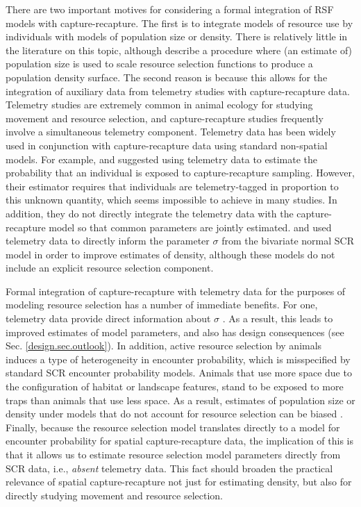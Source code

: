 There are two important motives for considering a formal integration
of RSF models with capture-recapture. The first is to integrate models
of resource use by individuals with models of population size or
density. There is relatively little in the literature on this topic,
although \citet{boyce_mcdonald:1999} describe a procedure where (an
estimate of) population size is used to scale resource selection
functions to produce a population density surface. The second reason is because
this allows for the integration of auxiliary data from telemetry
studies with capture-recapture data.  Telemetry studies are extremely
common in animal ecology for studying movement and resource selection,
and capture-recapture studies frequently involve a simultaneous
telemetry component.  Telemetry data has been widely used in
conjunction with capture-recapture data using standard non-spatial
models.  For example, \citet{white_shenk:2001} and \citet{ivan:2012}
suggested using telemetry data to estimate the probability that an
individual is exposed to capture-recapture sampling. However, their estimator requires
that individuals are telemetry-tagged in proportion to this unknown quantity,
which seems impossible to achieve in many studies. In addition, they
do not directly integrate the telemetry data with the
capture-recapture model so that common parameters are jointly
estimated.  \citet{sollmann_etal:inprepjapplecol} and
\citet{sollmann_etal:2012ecol} used telemetry data to directly inform
the parameter $\sigma$ from the bivariate normal SCR model in order to
improve estimates of density, although these models do not include an
explicit resource selection component.

Formal integration of capture-recapture with telemetry data for the
purposes of modeling resource selection has a number of immediate
benefits. For one, telemetry data provide direct information about
$\sigma$
\citep{sollmann_etal:2012ecol,sollmann_etal:inprepjapplecol}. As a
result, this leads to improved estimates of model parameters, and also
has design consequences (see Sec. \ref{design.sec.outlook}).  In
addition, active resource selection by animals induces a type of
heterogeneity in encounter probability, which is misspecified by
standard SCR encounter probability models.  Animals that use more
space due to the configuration of habitat or landscape features, stand
to be exposed to more traps than animals that use less space.
As a result, estimates of
population size or density under models that do not account for
resource selection can be biased \citep{royle_etal:2012mee}.  Finally,
because the resource selection model translates directly to a model
for encounter probability for spatial capture-recapture data, the
implication of this is that it allows us to estimate resource
selection model parameters directly from SCR data, i.e., {\it absent}
telemetry data. This fact should broaden the practical relevance of
spatial capture-recapture not just for estimating density, but also
for directly studying movement and resource selection.








